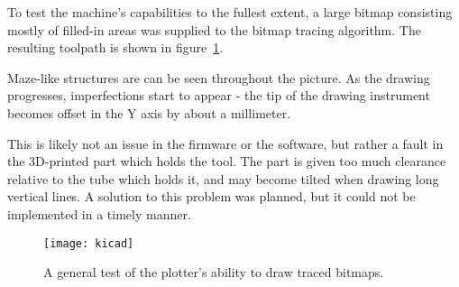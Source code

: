 To test the machine's capabilities to the fullest extent, a large bitmap
consisting mostly of filled-in areas was supplied to the bitmap tracing
algorithm. The resulting toolpath is shown in figure~\ref{kicad}.

Maze-like structures are can be seen throughout the picture. As the drawing
progresses, imperfections start to appear - the tip of the drawing instrument
becomes offset in the Y axis by about a millimeter.

This is likely not an issue in the firmware or the software, but rather a fault
in the 3D-printed part which holds the tool. The part is given too much
clearance relative to the tube which holds it, and may become tilted when
drawing long vertical lines. A solution to this problem was planned, but it
could not be implemented in a timely manner.

\begin{figure}[ht]
    \begin{center}
        \texttt{[image: kicad]}
        \caption{A general test of the plotter's ability to draw traced
        bitmaps.}
        \label{kicad}
    \end{center}
\end{figure}
